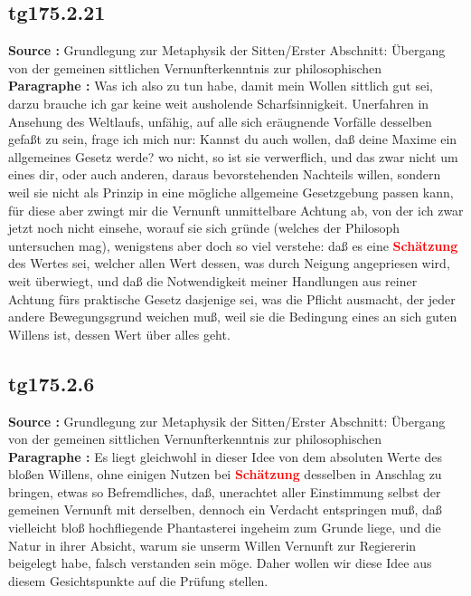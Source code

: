 \documentclass[a4paper,12pt,twoside]{book}
\newcommand{\match}[1]{\textcolor{red}{\textbf{#1}}}
\begin{document}
	\subsection*{tg175.2.21} 
	\textbf{Source : }Grundlegung zur Metaphysik der Sitten/Erster Abschnitt: Übergang von der gemeinen sittlichen Vernunfterkenntnis zur philosophischen\\  
	
	\textbf{Paragraphe : }Was ich also zu tun habe, damit mein Wollen sittlich gut sei, darzu brauche ich gar keine weit ausholende Scharfsinnigkeit. Unerfahren in Ansehung des Weltlaufs, unfähig, auf alle sich eräugnende Vorfälle desselben gefaßt zu sein, frage ich mich nur: Kannst du auch wollen, daß deine Maxime ein allgemeines Gesetz werde? wo nicht, so ist sie verwerflich, und das zwar nicht um eines dir, oder auch anderen, daraus bevorstehenden Nachteils willen, sondern weil sie nicht als Prinzip in eine mögliche allgemeine Gesetzgebung passen kann, für diese aber zwingt mir die Vernunft unmittelbare Achtung ab, von der ich zwar jetzt noch nicht einsehe, worauf sie sich gründe (welches der Philosoph untersuchen mag), wenigstens aber doch so viel verstehe: daß es eine \match{Schätzung} des Wertes sei, welcher allen Wert dessen, was durch Neigung angepriesen wird, weit überwiegt, und daß die Notwendigkeit meiner Handlungen aus reiner Achtung fürs praktische Gesetz dasjenige sei, was die Pflicht ausmacht, der jeder andere Bewegungsgrund weichen muß, weil sie die Bedingung eines an sich guten Willens ist, dessen Wert über alles geht. 
	
	\subsection*{tg175.2.6} 
	\textbf{Source : }Grundlegung zur Metaphysik der Sitten/Erster Abschnitt: Übergang von der gemeinen sittlichen Vernunfterkenntnis zur philosophischen\\  
	
	\textbf{Paragraphe : }Es liegt gleichwohl in dieser Idee von dem absoluten Werte des bloßen Willens, ohne einigen Nutzen bei \match{Schätzung} desselben in Anschlag zu bringen, etwas so Befremdliches, daß, unerachtet aller Einstimmung selbst der gemeinen  Vernunft mit derselben, dennoch ein Verdacht entspringen muß, daß vielleicht bloß hochfliegende Phantasterei ingeheim zum Grunde liege, und die Natur in ihrer Absicht, warum sie unserm Willen Vernunft zur Regiererin beigelegt habe, falsch verstanden sein möge. Daher wollen wir diese Idee aus diesem Gesichtspunkte auf die Prüfung stellen. 
	
\end{document}
